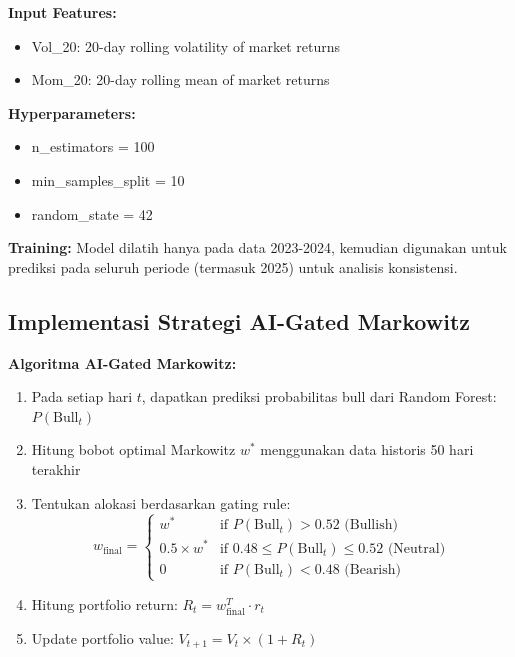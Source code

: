 \documentclass[12pt,a4paper]{article}
\begin{document}
\textbf{Input Features:}
\begin{itemize}
    \item Vol\_20: 20-day rolling volatility of market returns
    \item Mom\_20: 20-day rolling mean of market returns
\end{itemize}

\textbf{Hyperparameters:}
\begin{itemize}
    \item n\_estimators = 100
    \item min\_samples\_split = 10
    \item random\_state = 42
\end{itemize}

\textbf{Training:} Model dilatih hanya pada data 2023-2024, kemudian digunakan untuk prediksi pada seluruh periode (termasuk 2025) untuk analisis konsistensi.

\subsection{Implementasi Strategi AI-Gated Markowitz}

\textbf{Algoritma AI-Gated Markowitz:}

\begin{enumerate}
    \item Pada setiap hari $t$, dapatkan prediksi probabilitas bull dari Random Forest: $P(\text{Bull}_t)$
    
    \item Hitung bobot optimal Markowitz $w^*$ menggunakan data historis 50 hari terakhir
    
    \item Tentukan alokasi berdasarkan gating rule:
    \begin{equation}
    w_{\text{final}} = \begin{cases}
    w^* & \text{if } P(\text{Bull}_t) > 0.52 \text{ (Bullish)} \\
    0.5 \times w^* & \text{if } 0.48 \leq P(\text{Bull}_t) \leq 0.52 \text{ (Neutral)} \\
    0 & \text{if } P(\text{Bull}_t) < 0.48 \text{ (Bearish)}
    \end{cases}
    \end{equation}
    
    \item Hitung portfolio return: $R_t = w_{\text{final}}^T \cdot r_t$
    
    \item Update portfolio value: $V_{t+1} = V_t \times (1 + R_t)$
\end{enumerate}
\end{document}
